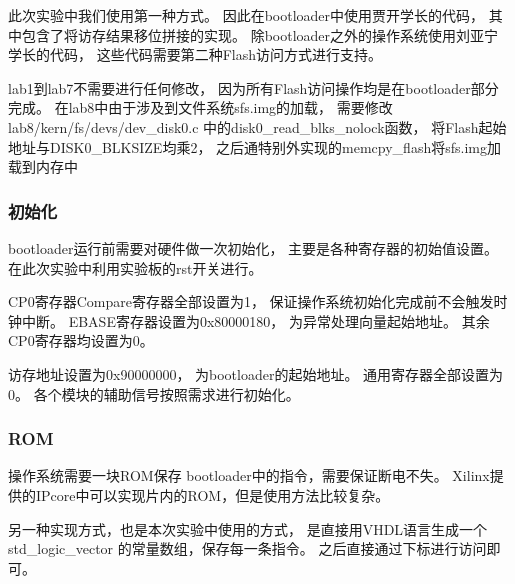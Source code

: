             此次实验中我们使用第一种方式。
            因此在bootloader中使用贾开学长的代码，
            其中包含了将访存结果移位拼接的实现。
            除bootloader之外的操作系统使用刘亚宁学长的代码，
            这些代码需要第二种Flash访问方式进行支持。

            lab1到lab7不需要进行任何修改，
            因为所有Flash访问操作均是在bootloader部分完成。
            在lab8中由于涉及到文件系统sfs.img的加载，
            需要修改lab8/kern/fs/devs/dev\_disk0.c
            中的disk0\_read\_blks\_nolock函数，
            将Flash起始地址与DISK0\_BLKSIZE均乘2，
            之后通特别外实现的memcpy\_flash将sfs.img加载到内存中

        \subsubsection{初始化}
            bootloader运行前需要对硬件做一次初始化，
            主要是各种寄存器的初始值设置。
            在此次实验中利用实验板的rst开关进行。

            CP0寄存器Compare寄存器全部设置为1，
            保证操作系统初始化完成前不会触发时钟中断。
            EBASE寄存器设置为0x80000180，
            为异常处理向量起始地址。
            其余CP0寄存器均设置为0。

            访存地址设置为0x90000000，
            为bootloader的起始地址。
            通用寄存器全部设置为0。
            各个模块的辅助信号按照需求进行初始化。

        \subsubsection{ROM}
            操作系统需要一块ROM保存
            bootloader中的指令，需要保证断电不失。
            Xilinx提供的IPcore中可以实现片内的ROM，但是使用方法比较复杂。

            另一种实现方式，也是本次实验中使用的方式，
            是直接用VHDL语言生成一个std\_logic\_vector
            的常量数组，保存每一条指令。
            之后直接通过下标进行访问即可。
            
